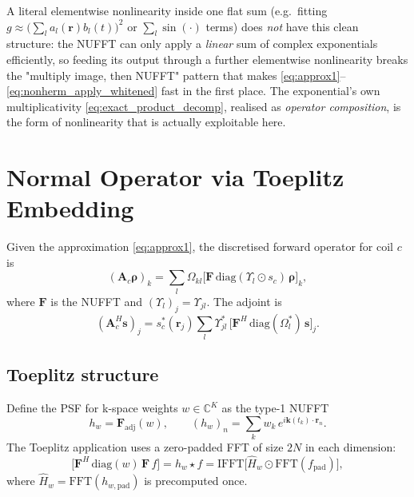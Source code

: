 \documentclass{article}
\begin{document}
A literal elementwise nonlinearity inside one flat sum (e.g.\ fitting
$g\approx\bigl(\sum_l a_l(\mathbf{r})b_l(t)\bigr)^2$ or $\sum_l\sin(\cdot)$ terms) does \emph{not}
have this clean structure: the NUFFT can only apply a \emph{linear} sum of complex exponentials
efficiently, so feeding its output through a further elementwise nonlinearity breaks the
"multiply image, then NUFFT" pattern that makes \eqref{eq:approx1}--\eqref{eq:nonherm_apply_whitened}
fast in the first place. The exponential's own multiplicativity \eqref{eq:exact_product_decomp},
realised as \emph{operator composition}, is the form of nonlinearity that is actually exploitable
here.

\section*{Normal Operator via Toeplitz Embedding}

Given the approximation \eqref{eq:approx1}, the discretised forward operator for coil $c$ is
\begin{equation}
    (\mathbf{A}_c \boldsymbol{\rho})_k
        = \sum_l \Omega_{kl}
          \bigl[\mathbf{F}\,\mathrm{diag}(\Upsilon_l \odot s_c)\,\boldsymbol{\rho}\bigr]_k,
\end{equation}
where $\mathbf{F}$ is the NUFFT and $(\Upsilon_l)_j = \Upsilon_{jl}$.
The adjoint is
\begin{equation}
    (\mathbf{A}_c^H \mathbf{s})_j
        = s_c^*(\mathbf{r}_j)
          \sum_l \Upsilon_{jl}^*\,\bigl[\mathbf{F}^H\,\mathrm{diag}(\Omega_l^*)\,\mathbf{s}\bigr]_j.
\end{equation}

\subsection*{Toeplitz structure}

Define the PSF for k-space weights $w \in \mathbb{C}^K$ as the type-1 NUFFT
\begin{equation}
    h_w = \mathbf{F}_{\mathrm{adj}}(w), \qquad
    (h_w)_n = \sum_k w_k\,e^{i\mathbf{k}(t_k)\cdot\mathbf{r}_n}.
    \label{eq:psf_def}
\end{equation}
The Toeplitz application uses a zero-padded FFT of size $2N$ in each dimension:
\begin{equation}
    \bigl[\mathbf{F}^H\,\mathrm{diag}(w)\,\mathbf{F}\,f\bigr]
        = h_w \star f
        = \mathrm{IFFT}\!\bigl[\hat{H}_w \odot \mathrm{FFT}(f_{\mathrm{pad}})\bigr],
    \label{eq:toeplitz_apply}
\end{equation}
where $\hat{H}_w = \mathrm{FFT}(h_{w,\mathrm{pad}})$ is precomputed once.
\end{document}
